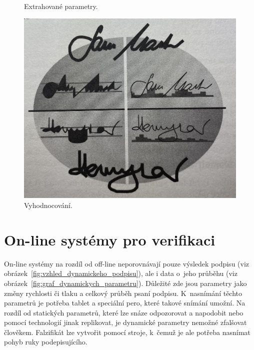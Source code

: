 \begin{figure}[H]
\begin{minipage}{0.35\textwidth}
    \caption{Extrahované parametry.~\cite{RakRoman2008}}
    \label{fig:extrahovany}
  \end{minipage}\hfill
  \begin{minipage}{0.6\textwidth}
    \centering
    \includegraphics[width=\textwidth]{obrazky-figures/vyhodnocovani.jpg}
    \caption{Vyhodnocování.~\cite{RakRoman2008}}
    \label{fig:vyhodnocovani}
  \end{minipage}
\end{figure}


\section{On-line systémy pro verifikaci} 
On-line systémy na rozdíl od off-line neporovnávají pouze výsledek podpisu (viz obrázek~\ref{fig:vzhled_dynamickeho_podpisu}), ale i data o~jeho průběhu (viz obrázek~\ref{fig:graf_dynamickych_parametru}). %
Důležité zde jsou parametry jako změny rychlosti či tlaku a celkový průběh psaní podpisu.     %
K~nasnímání těchto parametrů je potřeba tablet a speciální pero, které takové snímání umožní. %
Na rozdíl od statických parametrů, které lze snáze odpozorovat a napodobit                    %
nebo pomocí technologií jinak replikovat, je dynamické parametry nemožné zfalšovat člověkem.  %
Falzifikát lze vytvořit pomocí stroje, k~čemuž je ale potřeba nasnímat pohyb ruky podepisujícího.~\cite{VaccaJohnR2007}%

